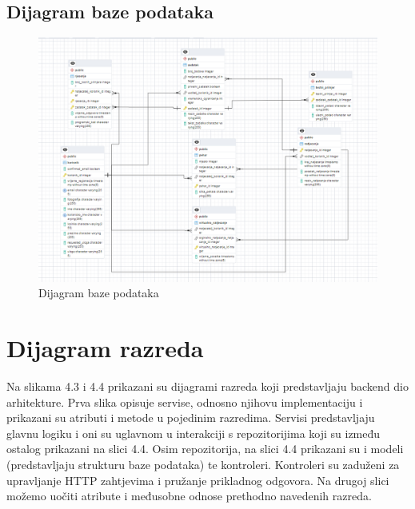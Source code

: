 		
\pagebreak
\subsection{Dijagram baze podataka}
\begin{figure}[H]
	\includegraphics[scale=0.7]{dijagrami/dijagram_baze_podataka.png}
	\centering
	\caption{Dijagram baze podataka}
	\label{fig:bazaPodataka} 
\end{figure}

\eject


\section{Dijagram razreda}

Na slikama 4.3 i 4.4 prikazani su dijagrami razreda koji predstavljaju backend dio arhitekture.
Prva slika opisuje servise, odnosno njihovu implementaciju i prikazani su atributi i metode u pojedinim razredima.
Servisi predstavljaju glavnu logiku i oni su uglavnom u interakciji s repozitorijima koji su između ostalog prikazani na slici 4.4.
Osim repozitorija, na slici 4.4 prikazani su i modeli (predstavljaju strukturu baze podataka) te kontroleri. 
Kontroleri su zaduženi za upravljanje HTTP zahtjevima i pružanje prikladnog odgovora. Na drugoj slici možemo uočiti atribute i međusobne odnose prethodno navedenih razreda. \\


